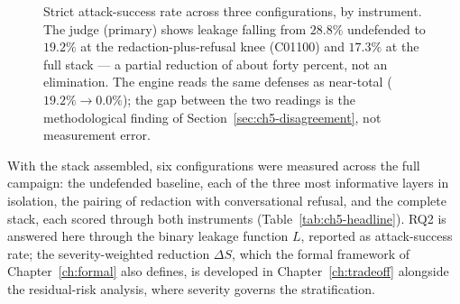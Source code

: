 \begin{figure}[h]
\centering
{}
\caption[Leakage reduction across configurations, read through both instruments]{Strict
attack-success rate across three configurations, by instrument. The judge (primary) shows leakage
falling from $28.8\%$ undefended to $19.2\%$ at the redaction-plus-refusal knee (C01100) and
$17.3\%$ at the full stack --- a partial reduction of about forty percent, not an elimination.
The engine reads the same defenses as near-total ($19.2\%\!\to\!0.0\%$); the gap between the two
readings is the methodological finding of Section~\ref{sec:ch5-disagreement}, not measurement
error.}
\label{fig:ch5-reduction}
\end{figure}

With the stack assembled, six configurations were measured across the full campaign: the
undefended baseline, each of the three most informative layers in isolation, the pairing of
redaction with conversational refusal, and the complete stack, each scored through
both instruments (Table~\ref{tab:ch5-headline}). RQ2 is answered here through the binary
leakage function $L$, reported as attack-success rate; the severity-weighted reduction
$\Delta S$, which the formal framework of Chapter~\ref{ch:formal} also defines, is developed
in Chapter~\ref{ch:tradeoff} alongside the residual-risk analysis, where severity governs
the stratification.

